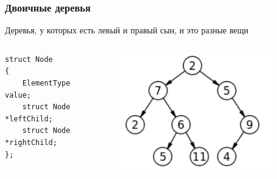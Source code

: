\documentclass[xetex,mathserif,serif]{beamer}
\begin{document}
    \begin{frame}[fragile]
        \frametitle{Двоичные деревья}
        Деревья, у которых есть левый и правый сын, и это разные вещи
        \begin{columns}
            \begin{column}{0.4\textwidth}
                \begin{footnotesize}
                    \begin{verbatim}
struct Node
{
    ElementType value;
    struct Node *leftChild;
    struct Node *rightChild;
};
                    \end{verbatim}
                \end{footnotesize}
            \end{column}
            \begin{column}{0.5\textwidth}
                \begin{center}
                    \includegraphics[width=0.8\textwidth]{binary-tree.png}
                \end{center}
            \end{column}
        \end{columns}
    \end{frame}
\end{document}
